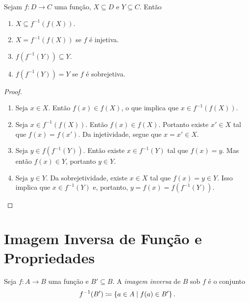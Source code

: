 \begin{prop}
Sejam $f: D \to C$ uma função, $X \subseteq D$ e $Y \subseteq C$. Então
	\begin{enumerate}
	\item $X \subseteq f^{-1}(f(X))$.
	\item $X = f^{-1}(f(X))$ se $f$ é injetiva.
	\item $f(f^{-1}(Y)) \subseteq Y$.
	\item $f(f^{-1}(Y)) = Y$ se $f$ é sobrejetiva.
	\end{enumerate}
\end{prop}
\begin{proof}
	\begin{enumerate}
	\item Seja $x \in X$. Então $f(x) \in f(X)$, o que implica que $x \in f^{-1}(f(X))$.
	
	\item Seja $x \in f^{-1}(f(X))$. Então $f(x) \in f(X)$. Portanto existe $x' \in X$ tal que $f(x)=f(x')$. Da injetividade, segue que $x=x' \in X$.
	
	\item Seja $y \in f(f^{-1}(Y))$. Então existe $x \in f^{-1}(Y)$ tal que $f(x)=y$. Mas então $f(x) \in Y$, portanto $y \in Y$.
	
	\item Seja $y \in Y$. Da sobrejetividade, existe $x \in X$ tal que $f(x)=y \in Y$. Isso implica que $x \in f^{-1}(Y)$ e, portanto, $y=f(x)=f(f^{-1}(Y))$.
	\end{enumerate}
\end{proof}

\section{Imagem Inversa de Função e Propriedades}

\begin{defi}
	Seja $f: A \to B$ uma função e $B' \subseteq B$. A \emph{imagem inversa} de $B$ sob $f$ é o conjunto
	\begin{equation*}
	f^{-1}(B') \coloneqq \set{a \in A}{f(a) \in B'}.
	\end{equation*}
\end{defi}

